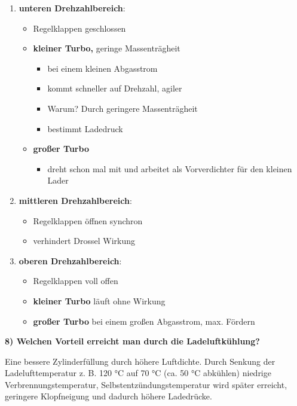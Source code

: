\begin{enumerate}
\item
  \textbf{unteren Drehzahlbereich}:

  \begin{itemize}
  \item
    Regelklappen geschlossen
  \item
    \textbf{kleiner Turbo,} geringe Massenträgheit

    \begin{itemize}
    \item
      bei einem kleinen Abgasstrom
    \item
      kommt schneller auf Drehzahl, agiler
    \item
      Warum? Durch geringere Massenträgheit
    \item
      bestimmt Ladedruck
    \end{itemize}
  \item
    \textbf{großer Turbo}

    \begin{itemize}
    \item
      dreht schon mal mit und arbeitet als Vorverdichter für den kleinen
      Lader
    \end{itemize}
  \end{itemize}
\item
  \textbf{mittleren Drehzahlbereich}:

  \begin{itemize}
  \item
    Regelklappen öffnen synchron
  \item
    verhindert Drossel Wirkung
  \end{itemize}
\item
  \textbf{oberen Drehzahlbereich}:

  \begin{itemize}
  \item
    Regelklappen voll offen
  \item
    \textbf{kleiner Turbo} läuft ohne Wirkung
  \item
    \textbf{großer Turbo} bei einem großen Abgasstrom, max. Fördern
  \end{itemize}
\end{enumerate}

\textbf{8) Welchen Vorteil erreicht man durch die Ladeluftkühlung?}

Eine bessere Zylinderfüllung durch höhere Luftdichte. Durch Senkung der
Ladelufttemperatur z. B. 120 °C auf 70 °C (ca. 50 °C abkühlen) niedrige
Verbrennungstemperatur, Selbstentzündungstemperatur wird später
erreicht, geringere Klopfneigung und dadurch höhere Ladedrücke.

